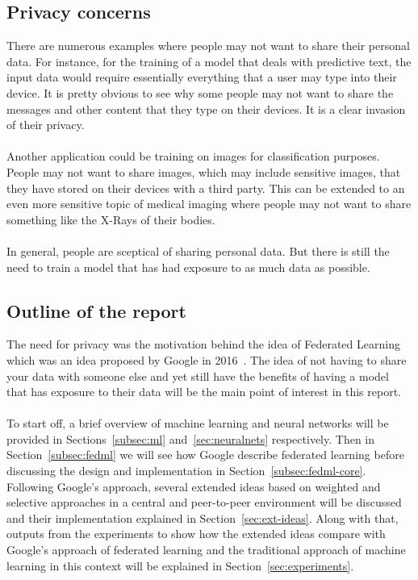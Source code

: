 \documentclass[12pt]{article}
\begin{document}
\subsection{Privacy concerns}
There are numerous examples where people may not want to share their personal data. For instance, for the training of a model that deals with predictive text, the input data would require essentially everything that a user may type into their device. It is pretty obvious to see why some people may not want to share the messages and other content that they type on their devices. It is a clear invasion of their privacy.
\\\\
Another application could be training on images for classification purposes. People may not want to share images, which may include sensitive images, that they have stored on their devices with a third party. This can be extended to an even more sensitive topic of medical imaging where people may not want to share something like the X-Rays of their bodies.
\\\\
In general, people are sceptical of sharing personal data. But there is still the need to train a model that has had exposure to as much data as possible. 
\subsection{Outline of the report}
The need for privacy was the motivation behind the idea of Federated Learning which was an idea proposed by Google in 2016~\cite{konen2016federated}. The idea of not having to share your data with someone else and yet still have the benefits of having a model that has exposure to their data will be the main point of interest in this report. 
\\\\
To start off, a brief overview of machine learning and neural networks will be provided in Sections~\ref{subsec:ml} and~\ref{sec:neuralnets} respectively. Then in Section~\ref{subsec:fedml} we will see how Google describe federated learning before discussing the design and implementation in Section~\ref{subsec:fedml-core}. Following Google's approach, several extended ideas based on weighted and selective approaches in a central and peer-to-peer environment will be discussed and their implementation explained in Section~\ref{sec:ext-ideas}. Along with that, outputs from the experiments to show how the extended ideas compare with Google's approach of federated learning and the traditional approach of machine learning in this context will be explained in Section~\ref{sec:experiments}. 
\end{document}
